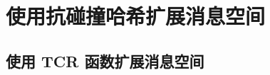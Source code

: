 \section{使用抗碰撞哈希扩展消息空间}\label{sec:13-2}

\begin{theorem}\label{theo:13-1}
	
\end{theorem}

\subsection{使用 TCR 函数扩展消息空间}\label{subsec:13-2-1}

\begin{theorem}\label{theo:13-2}
	
\end{theorem}